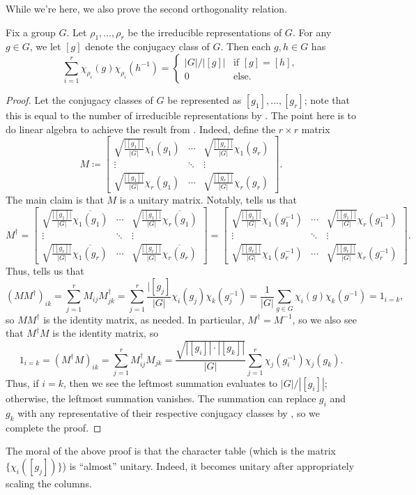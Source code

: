 \documentclass[../main.tex]{subfiles}
\begin{document}
While we're here, we also prove the second orthogonality relation.
\begin{corollary}
	Fix a group $G$. Let $\rho_1,\ldots,\rho_r$ be the irreducible representations of $G$. For any $g\in G$, we let $[g]$ denote the conjugacy class of $G$. Then each $g,h\in G$ has
	\[\sum_{i=1}^r\chi_{\rho_i}(g)\chi_{\rho_i}\left(h^{-1}\right)=\begin{cases}
		|G|/|[g]| & \text{if }[g]=[h], \\
		0 & \text{else}.
	\end{cases}\]
\end{corollary}
\begin{proof}
	Let the conjugacy classes of $G$ be represented as $[g_1],\ldots,[g_r]$; note that this is equal to the number of irreducible representations by . The point here is to do linear algebra to achieve the result from . Indeed, define the $r\times r$ matrix
	\[M\coloneqq\begin{bmatrix}
		\sqrt{\frac{|[g_1]|}{|G|}}\chi_1(g_1) & \cdots & \sqrt{\frac{|[g_r]|}{|G|}}\chi_1(g_r) \\
		\vdots & \ddots & \vdots \\
		\sqrt{\frac{|[g_1]|}{|G|}}\chi_r(g_1) & \cdots & \sqrt{\frac{|[g_r]|}{|G|}}\chi_r(g_r)
	\end{bmatrix}.\]
	The main claim is that $M$ is a unitary matrix. Notably,  tells us that
	\[M^\dagger=\begin{bmatrix}
		\sqrt{\frac{|[g_1]|}{|G|}}\overline{\chi_1(g_1)} & \cdots & \sqrt{\frac{|[g_1]|}{|G|}}\overline{\chi_r(g_1)} \\
		\vdots & \ddots & \vdots \\
		\sqrt{\frac{|[g_r]|}{|G|}}\overline{\chi_1(g_r)} & \cdots & \sqrt{\frac{|[g_r]|}{|G|}}\overline{\chi_r(g_r)}
	\end{bmatrix}=\begin{bmatrix}
		\sqrt{\frac{|[g_1]|}{|G|}}{\chi_1\left(g_1^{-1}\right)} & \cdots & \sqrt{\frac{|[g_1]|}{|G|}}{\chi_r\left(g_1^{-1}\right)} \\
		\vdots & \ddots & \vdots \\
		\sqrt{\frac{|[g_r]|}{|G|}}{\chi_1\left(g_r^{-1}\right)} & \cdots & \sqrt{\frac{|[g_r]|}{|G|}}{\chi_r\left(g_r^{-1}\right)}
	\end{bmatrix}.\]
	Thus,  tells us that
	\[(MM^\dagger)_{ik}=\sum_{j=1}^rM_{ij}M_{jk}^\dagger=\sum_{j=1}^r\frac{|[g_j]}{|G|}\chi_i(g_j)\chi_k\left(g_j^{-1}\right)=\frac1{|G|}\sum_{g\in G}\chi_i(g)\chi_k(g^{-1})=1_{i=k},\]
	so $MM^\dagger$ is the identity matrix, as needed. In particular, $M^\dagger=M^{-1}$, so we also see that $M^\dagger M$ is the identity matrix, so
	\[1_{i=k}=(M^\dagger M)_{ik}=\sum_{j=1}^rM^\dagger_{ij}M_{jk}=\frac{\sqrt{|[g_i]|\cdot|[g_k]|}}{|G|}\sum_{j=1}^r\chi_j(g_i^{-1})\chi_j(g_k).\]
	Thus, if $i=k$, then we see the leftmost summation evaluates to $|G|/|[g_i]|$; otherwise, the leftmost summation vanishes. The summation can replace $g_i$ and $g_k$ with any representative of their respective conjugacy classes by , so we complete the proof.
\end{proof}
\begin{remark}
	The moral of the above proof is that the character table (which is the matrix $\{\chi_i([g_j])\}$) is ``almost'' unitary. Indeed, it becomes unitary after appropriately scaling the columns.
\end{remark}
\end{document}
